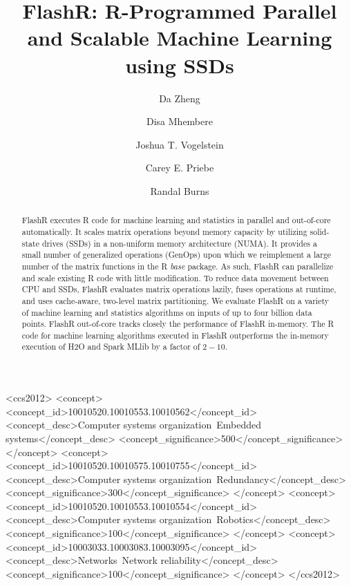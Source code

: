 \documentclass[sigconf]{acmart}
\begin{document}
\title{FlashR: R-Programmed Parallel and Scalable Machine Learning using SSDs}
\titlenote{}
\subtitle{}
\subtitlenote{}



\author[1]{\rm Da Zheng}
\author[1]{\rm Disa Mhembere}
\author[3]{\rm Joshua T. Vogelstein}
\author[2]{\rm Carey E. Priebe}
\author[1]{\rm Randal Burns}


\begin{abstract}
FlashR executes R code for machine learning and statistics 
in parallel and out-of-core automatically. It scales matrix operations
beyond memory capacity by utilizing solid-state drives (SSDs) in a non-uniform
memory architecture (NUMA). It provides a small number of generalized 
operations (GenOps) upon which we reimplement a large number of the
matrix functions in the R \textit{base} package. As such, FlashR can parallelize
and scale existing R code with little modification. To reduce data movement
between CPU and SSDs, FlashR evaluates matrix operations lazily, fuses
operations at runtime, and uses cache-aware, two-level matrix partitioning.
We evaluate FlashR on a variety of machine learning and statistics algorithms 
on inputs of up to four billion data points.
FlashR out-of-core tracks closely the performance of FlashR in-memory.
The R code for machine learning algorithms executed in FlashR
outperforms the in-memory execution of H2O and Spark MLlib by a factor of $2-10$.
\end{abstract}

%
%
\begin{CCSXML}
<ccs2012>
 <concept>
  <concept_id>10010520.10010553.10010562</concept_id>
  <concept_desc>Computer systems organization~Embedded systems</concept_desc>
  <concept_significance>500</concept_significance>
 </concept>
 <concept>
  <concept_id>10010520.10010575.10010755</concept_id>
  <concept_desc>Computer systems organization~Redundancy</concept_desc>
  <concept_significance>300</concept_significance>
 </concept>
 <concept>
  <concept_id>10010520.10010553.10010554</concept_id>
  <concept_desc>Computer systems organization~Robotics</concept_desc>
  <concept_significance>100</concept_significance>
 </concept>
 <concept>
  <concept_id>10003033.10003083.10003095</concept_id>
  <concept_desc>Networks~Network reliability</concept_desc>
  <concept_significance>100</concept_significance>
 </concept>
</ccs2012>  
\end{CCSXML}
\end{document}
